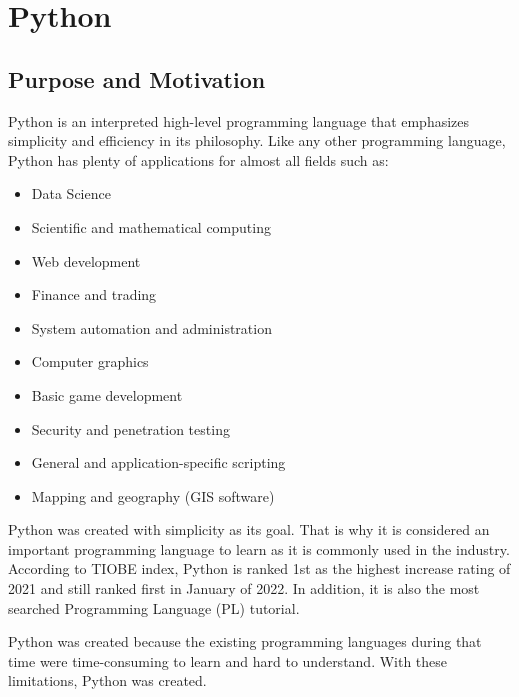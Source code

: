 \documentclass{article}
\begin{document}
\pagebreak

\section*{Python}

\subsection*{Purpose and Motivation}
\par
Python is an interpreted high-level programming language that emphasizes simplicity and efficiency in its philosophy. Like any other programming language, Python has plenty of applications for almost all fields such as:
\begin{itemize}[noitemsep]
\item Data Science
\item Scientific and mathematical computing
\item Web development
\item Finance and trading
\item System automation and administration
\item Computer graphics
\item Basic game development
\item Security and penetration testing
\item General and application-specific scripting
\item Mapping and geography (GIS software)
\end{itemize}
\par
Python was created with simplicity as its goal. That is why it is considered an important programming language to learn as it is commonly used in the industry. According to TIOBE index, Python is ranked 1st as the highest increase rating of 2021 and still ranked first in January of 2022. In addition, it is also the most searched Programming Language (PL) tutorial.
\par
Python was created because the existing programming languages during that time were time-consuming to learn and hard to understand. With these limitations, Python was created.

\end{document}

